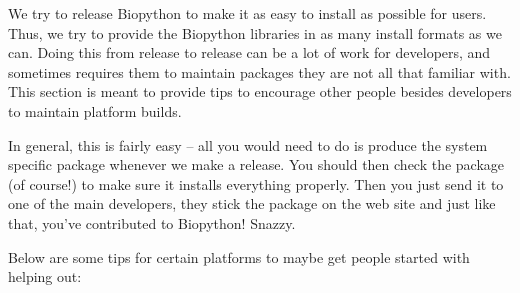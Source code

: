 \documentclass{report}
\begin{document}
We try to release Biopython to make it as easy to install as possible for users. Thus, we try to provide the Biopython libraries in as many install formats as we can. Doing this from release to release can be a lot of work for developers, and sometimes requires them to maintain packages they are not all that familiar with. This section is meant to provide tips to encourage other people besides developers to maintain platform builds.


In general, this is fairly easy -- all you would need to do is produce the system specific package whenever we make a release. You should then check the package (of course!) to make sure it installs everything properly. Then you just send it to one of the main developers, they stick the package on the web site and just like that, you've contributed to Biopython! Snazzy.


Below are some tips for certain platforms to maybe get people started with helping out:
\end{document}

